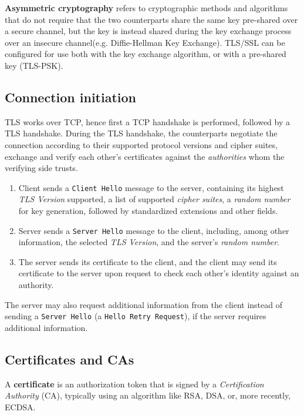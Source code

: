 \documentclass[a4]{report}
\begin{document}
\textbf{Asymmetric cryptography} refers to cryptographic methods and algorithms that do not require that the two counterparts share the same key pre-shared over a secure channel, but the key is instead shared during the key exchange process over an insecure channel(e.g. Diffie-Hellman Key Exchange). TLS/SSL can be configured for use both with the key exchange algorithm, or with a pre-shared key (TLS-PSK)\cite{rfc8446}.

\subsection{Connection initiation}

TLS works over TCP, hence first a TCP handshake is performed, followed by a TLS handshake. During the TLS handshake, the counterparts negotiate the connection according to their supported protocol versions and cipher suites, exchange and verify each other's certificates against the \textit{authorities} whom the verifying side trusts.

\begin{enumerate}
  \item Client sends a \texttt{Client Hello} message to the server, containing its highest \textit{TLS Version} supported, a list of supported \textit{cipher suites}, a \textit{random number} for key generation, followed by standardized extensions and other fields.
  \item Server sends a \texttt{Server Hello} message to the client, including, among other information, the selected \textit{TLS Version}, and the server's \textit{random number}.
  \item The server sends its certificate to the client, and the client may send its certificate to the server upon request to check each other's identity against an authority.
\end{enumerate}

The server may also request additional information from the client instead of sending a \texttt{Server Hello} (a \texttt{Hello Retry Request}), if the server requires additional information\cite{rfc8446}.

\subsection{Certificates and CAs}

A \textbf{certificate} is an authorization token that is signed by a \textit{Certification Authority} (CA), typically using an algorithm like RSA, DSA, or, more recently, ECDSA.
\end{document}
